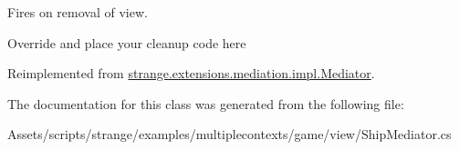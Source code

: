 Fires on removal of view. 

Override and place your cleanup code here 

Reimplemented from \hyperlink{classstrange_1_1extensions_1_1mediation_1_1impl_1_1_mediator_a9c65534ae8c37db9f4db7c84a94cd635}{strange.\-extensions.\-mediation.\-impl.\-Mediator}.



The documentation for this class was generated from the following file\-:\begin{DoxyCompactItemize}
\item 
Assets/scripts/strange/examples/multiplecontexts/game/view/Ship\-Mediator.\-cs\end{DoxyCompactItemize}
